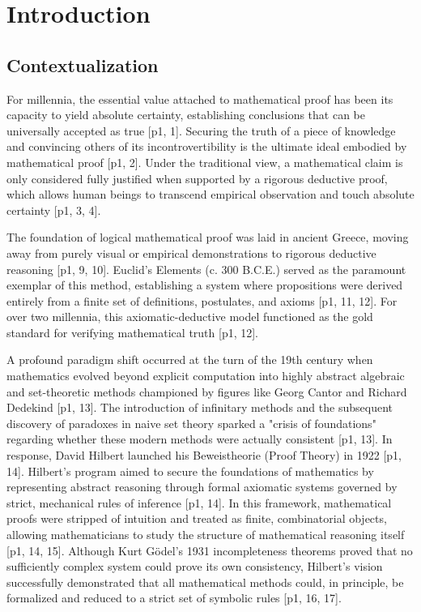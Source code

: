 \chapter[Introduction]{Introduction}

\section{Contextualization}

For millennia, the essential value attached to mathematical proof has been its capacity to yield absolute certainty, establishing conclusions that can be universally accepted as true [p1, 1]. Securing the truth of a piece of knowledge and convincing others of its incontrovertibility is the ultimate ideal embodied by mathematical proof [p1, 2]. Under the traditional view, a mathematical claim is only considered fully justified when supported by a rigorous deductive proof, which allows human beings to transcend empirical observation and touch absolute certainty [p1, 3, 4].

The foundation of logical mathematical proof was laid in ancient Greece, moving away from purely visual or empirical demonstrations to rigorous deductive reasoning [p1, 9, 10]. Euclid’s Elements (c. 300 B.C.E.) served as the paramount exemplar of this method, establishing a system where propositions were derived entirely from a finite set of definitions, postulates, and axioms [p1, 11, 12]. For over two millennia, this axiomatic-deductive model functioned as the gold standard for verifying mathematical truth [p1, 12].

A profound paradigm shift occurred at the turn of the 19th century when mathematics evolved beyond explicit computation into highly abstract algebraic and set-theoretic methods championed by figures like Georg Cantor and Richard Dedekind [p1, 13]. The introduction of infinitary methods and the subsequent discovery of paradoxes in naive set theory sparked a "crisis of foundations" regarding whether these modern methods were actually consistent [p1, 13]. In response, David Hilbert launched his Beweistheorie (Proof Theory) in 1922 [p1, 14]. Hilbert’s program aimed to secure the foundations of mathematics by representing abstract reasoning through formal axiomatic systems governed by strict, mechanical rules of inference [p1, 14]. In this framework, mathematical proofs were stripped of intuition and treated as finite, combinatorial objects, allowing mathematicians to study the structure of mathematical reasoning itself [p1, 14, 15]. Although Kurt Gödel’s 1931 incompleteness theorems proved that no sufficiently complex system could prove its own consistency, Hilbert’s vision successfully demonstrated that all mathematical methods could, in principle, be formalized and reduced to a strict set of symbolic rules [p1, 16, 17].

